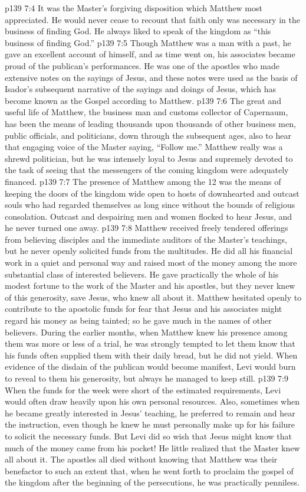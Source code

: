 \vs p139 7:4 It was the Master’s forgiving disposition which Matthew most appreciated. He would never cease to recount that faith only was necessary in the business of finding God. He always liked to speak of the kingdom as “this business of finding God.”
\vs p139 7:5 \pc Though Matthew was a man with a past, he gave an excellent account of himself, and as time went on, his associates became proud of the publican’s performances. He was one of the apostles who made extensive notes on the sayings of Jesus, and these notes were used as the basis of Isador’s subsequent narrative of the sayings and doings of Jesus, which has become known as the Gospel according to Matthew.
\vs p139 7:6 The great and useful life of Matthew, the business man and customs collector of Capernaum, has been the means of leading thousands upon thousands of other business men, public officials, and politicians, down through the subsequent ages, also to hear that engaging voice of the Master saying, “Follow me.” Matthew really was a shrewd politician, but he was intensely loyal to Jesus and supremely devoted to the task of seeing that the messengers of the coming kingdom were adequately financed.
\vs p139 7:7 The presence of Matthew among the 12 was the means of keeping the doors of the kingdom wide open to hosts of downhearted and outcast souls who had regarded themselves as long since without the bounds of religious consolation. Outcast and despairing men and women flocked to hear Jesus, and he never turned one away.
\vs p139 7:8 \pc Matthew received freely tendered offerings from believing disciples and the immediate auditors of the Master’s teachings, but he never openly solicited funds from the multitudes. He did all his financial work in a quiet and personal way and raised most of the money among the more substantial class of interested believers. He gave practically the whole of his modest fortune to the work of the Master and his apostles, but they never knew of this generosity, save Jesus, who knew all about it. Matthew hesitated openly to contribute to the apostolic funds for fear that Jesus and his associates might regard his money as being tainted; so he gave much in the names of other believers. During the earlier months, when Matthew knew his presence among them was more or less of a trial, he was strongly tempted to let them know that his funds often supplied them with their daily bread, but he did not yield. When evidence of the disdain of the publican would become manifest, Levi would burn to reveal to them his generosity, but always he managed to keep still.
\vs p139 7:9 When the funds for the week were short of the estimated requirements, Levi would often draw heavily upon his own personal resources. Also, sometimes when he became greatly interested in Jesus’ teaching, he preferred to remain and hear the instruction, even though he knew he must personally make up for his failure to solicit the necessary funds. But Levi did so wish that Jesus might know that much of the money came from his pocket! He little realized that the Master knew all about it. The apostles all died without knowing that Matthew was their benefactor to such an extent that, when he went forth to proclaim the gospel of the kingdom after the beginning of the persecutions, he was practically penniless.
